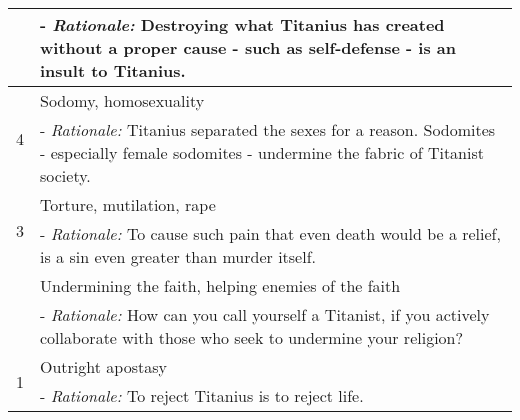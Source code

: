 \begin{table}[!htbp]
\begin{tabularx}{\textwidth}{|c|X|}
                                 & - \hspace{\parindent} \textit{Rationale:} Destroying what Titanius has created without a proper cause - such as self-defense - is an insult to Titanius. \\ 
                                 \midrule
\multirow{2}{*}{4}              & Sodomy, homosexuality             \\ 
                                 & - \hspace{\parindent} \textit{Rationale:} Titanius separated the sexes for a reason. Sodomites - especially female sodomites - undermine the fabric of Titanist society. \\ 
                                 \midrule
\multirow{2}{*}{3}              & Torture, mutilation, rape             \\ 
                                 & - \hspace{\parindent} \textit{Rationale:} To cause such pain that even death would be a relief, is a sin even greater than murder itself. \\\ 
                                 \midrule
\multirow{2}{*}{2}              & Undermining the faith, helping enemies of the faith             \\ 
                                 & - \hspace{\parindent} \textit{Rationale:} How can you call yourself a Titanist, if you actively collaborate with those who seek to undermine your religion? \\ 
                                 \midrule
\multirow{2}{*}{1}              & Outright apostasy             \\ 
                                 & - \hspace{\parindent} \textit{Rationale:} To reject Titanius is to reject life. \\ 
                                 \midrule
 \bottomrule
\end{tabularx}
\end{table}

\newpage
